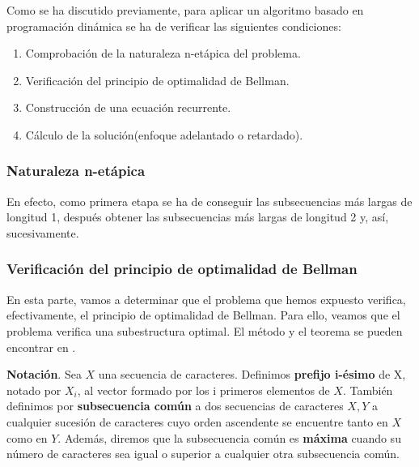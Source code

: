 Como se ha discutido previamente, para aplicar un algoritmo basado en programación
dinámica se ha de verificar las siguientes condiciones:

\begin{enumerate}
    \item Comprobación de la naturaleza n-etápica del problema. 
    \item Verificación del principio de optimalidad de Bellman. 
    \item Construcción de una ecuación recurrente. 
    \item Cálculo de la solución(enfoque adelantado o retardado). 
\end{enumerate}

\subsubsection{Naturaleza n-etápica}
En efecto, 
como primera etapa se ha de conseguir las subsecuencias más largas de longitud 1, 
después obtener las subsecuencias más largas de longitud 2 y, así, sucesivamente. 


\subsubsection{Verificación del principio de optimalidad de Bellman}

En esta parte, vamos a determinar que el problema que hemos expuesto verifica,
efectivamente, el principio de optimalidad de Bellman. Para ello, veamos que el
problema verifica una subestructura optimal. El método y el teorema se pueden encontrar
en \cite{Cormen2017}. 

\textbf{Notación}. Sea $X$ una secuencia de caracteres. Definimos \textbf{prefijo i-ésimo}
de X, notado por $X_i$, al vector formado por los i primeros elementos de $X$. 
También definimos por \textbf{subsecuencia común} a dos secuencias de caracteres $X,Y$ a cualquier sucesión de caracteres
cuyo orden ascendente se encuentre tanto en $X$ como en $Y$. Además, diremos que la
subsecuencia común es \textbf{máxima} cuando su número de caracteres sea igual o superior 
a cualquier otra subsecuencia común. 

